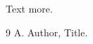 \documentclass{article}
\makeatletter
\newcommand\brokenref[1]{\protected@edef\reserved@a{\@firstoffive{#1}}}
\makeatother
\begin{document}
Text \brokenref{x} more.

\begin{thebibliography}{9}
 A. Author, Title.
\end{thebibliography}
\end{document}

